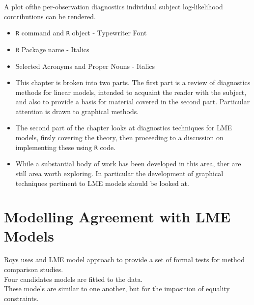 \documentclass[12pt, a4paper]{report}
\theoremstyle{plain}
\theoremstyle{definition}
\theoremstyle{remark}
\begin{document}
A plot ofthe per-observation diagnostics individual subject log-likelihood contributions can be rendered.


\begin{framed} 
	\begin{itemize}
		\item \texttt{R} command and \texttt{R} object - Typewriter Font
		\item \texttt{R} Package name - Italics
		\item Selected Acronyms and Proper Nouns - Italics
	\end{itemize}
\end{framed}
\medskip

\begin{itemize}	
	\item This chapter is broken into two parts. The first part is a review of diagnostics methods for linear models, intended to acquaint the
	reader with the subject, and also to provide a basis for material covered in the second part. Particular attention is drawn to graphical methods.
	
	\item The second part of the chapter looks at diagnostics techniques for LME models, firsly covering the theory, then proceeding to a discussion on 
	implementing these using \texttt{R} code.
	\item While a substantial body of work has been developed in this area, ther are still area worth exploring. 
	In particular the development of graphical techniques pertinent to LME models should be looked at.
\end{itemize}









\section{Modelling Agreement with LME Models}



Roys uses and LME model approach to provide a set of formal tests for method comparison studies.\\

Four candidates models are fitted to the data.\\

These models are similar to one another, but for the imposition of equality constraints.\\
\end{document}
